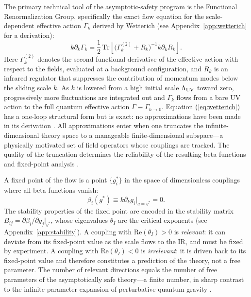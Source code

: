 \documentclass[12pt,a4paper]{article}
\begin{document}
The primary technical tool of the asymptotic-safety program is the Functional
Renormalization Group, specifically the exact flow equation for the
scale-dependent effective action $\Gamma_k$ derived by Wetterich
\cite{Wetterich1993} (see Appendix~\ref{app:wetterich} for a derivation):
\begin{equation}
k\partial_k\Gamma_k
= \frac{1}{2}\,\mathrm{Tr}
\!\left[\bigl(\Gamma^{(2)}_k + R_k\bigr)^{-1} k\partial_k R_k\right].
\label{eq:wetterich}
\end{equation}
Here $\Gamma^{(2)}_k$ denotes the second functional derivative of the
effective action with respect to the fields, evaluated at a background
configuration, and $R_k$ is an infrared regulator that suppresses the
contribution of momentum modes below the sliding scale $k$. As $k$ is lowered
from a high initial scale $\Lambda_{\rm UV}$ toward zero, progressively more
fluctuations are integrated out and $\Gamma_k$ flows from a bare UV action to
the full quantum effective action $\Gamma \equiv \Gamma_{k \to 0}$. Equation
(\ref{eq:wetterich}) has a one-loop structural form but is exact: no
approximations have been made in its derivation \cite{Berges2002,Dupuis2021}.
All approximations enter when one truncates the infinite-dimensional theory
space to a manageable finite-dimensional subspace---a physically motivated set
of field operators whose couplings are tracked. The quality of the truncation
determines the reliability of the resulting beta functions and fixed-point
analysis \cite{Pawlowski2007}.

A fixed point of the flow is a point $\{g^*_i\}$ in the space of
dimensionless couplings where all beta functions vanish:
\begin{equation}
\beta_i(g^*) \equiv k\partial_k g_i\big|_{g = g^*} = 0.
\end{equation}
The stability properties of the fixed point are encoded in the stability
matrix $B_{ij} = \partial\beta_i/\partial g_j|_{g^*}$, whose eigenvalues
$\theta_I$ are the critical exponents (see Appendix~\ref{app:stability}).
A coupling with $\text{Re}(\theta_I) > 0$ is \emph{relevant}: it can deviate
from its fixed-point value as the scale flows to the IR, and must be fixed by
experiment. A coupling with $\text{Re}(\theta_I) < 0$ is \emph{irrelevant}:
it is driven back to its fixed-point value and therefore constitutes a
prediction of the theory, not a free parameter. The number of relevant
directions equals the number of free parameters of the asymptotically safe
theory---a finite number, in sharp contrast to the infinite-parameter expansion
of perturbative quantum gravity \cite{Goldenfeld1992,Cardy1996}.
\end{document}

